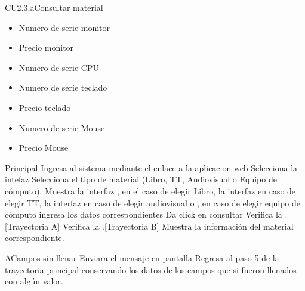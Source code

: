 \begin{UseCase}{CU2.3.a}{Consultar material}
{\begin{itemize}
			\item Numero de serie monitor 
			\item Precio monitor
			\item Numero de serie CPU
			\item Numero de serie teclado
			\item Precio teclado
			\item Numero de serie Mouse
			\item Precio Mouse						
	
		\end{itemize}				
		}

	\end{UseCase}
	\begin{UCtrayectoria}{Principal}
	\UCpaso[\UCactor] Ingresa al sistema mediante el enlace a la aplicacion web
	 \UCpaso[\UCactor] Selecciona la intefaz 
	  \UCpaso[\UCactor] Selecciona el tipo de material (Libro, TT, Audiovisual o Equipo de cómputo).
	 \UCpaso[\UCsist]Muestra la interfaz , en el caso de elegir Libro, la interfaz  en caso de elegir TT, la interfaz  en caso de elegir audiovisual o , en caso de elegir equipo de cómputo
	  \UCpaso[\UCactor] ingresa los datos correspondientes
	  \UCpaso[\UCactor] Da click en consultar
	   \UCpaso[\UCsist] Verifica la  .[Trayectoria A]
	    \UCpaso[\UCsist] Verifica la .[Trayectoria B]
	    \UCpaso[\UCsist] Muestra la información del material correspondiente.


	\end{UCtrayectoria}
		\begin{UCtrayectoriaA}{A}{Campos sin llenar}
			\UCpaso[\UCsist] Enviara el  mensaje en pantalla 
			\UCpaso[\UCsist] Regresa al paso 5 de la trayectoria principal conservando los datos de los campos que si fueron llenados con algún valor.
		\end{UCtrayectoriaA}
		
